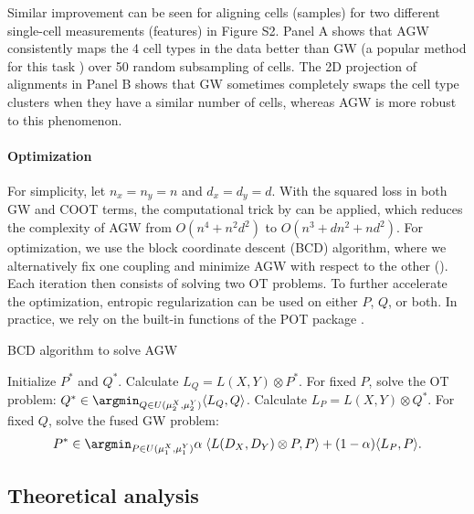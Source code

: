Similar improvement can be seen for aligning cells (samples) for two different single-cell
measurements (features) \citep{SNAREseq} in Figure S2. Panel A shows that AGW consistently maps
the 4 cell types in the data better than GW (a popular method for this task
\citep{Pamona,Demetci20,Demetci22,UniPort}) over 50 random subsampling of cells.
The 2D projection of alignments in Panel B shows that GW sometimes completely swaps
the cell type clusters when they have a similar number of cells, whereas AGW is more robust
to this phenomenon.

\paragraph{Optimization} For simplicity, let $n_x = n_y = n$ and $d_x = d_y = d$.
With the squared loss in both GW and COOT terms, the computational trick by \citep{Peyre16}
can be applied, which reduces the complexity of AGW from $O(n^4 + n^2 d^2)$
to $O(n^3 + dn^2 + nd^2)$. For optimization, we use the block coordinate descent (BCD) algorithm,
where we alternatively fix one coupling and minimize AGW with respect to the other ().
Each iteration then consists of solving two OT problems. To further accelerate the optimization,
entropic regularization can be used \citep{Cuturi13} on either $P$, $Q$, or both.
In practice, we rely on the built-in functions of the POT package \citep{Flamary21}.

\begin{algorithm}[t]
    \caption{BCD algorithm to solve AGW \label{alg:bcd_agw}}
    \begin{algorithmic}[1]
      \STATE Initialize $P^*$ and $Q^*$.
      \REPEAT
      \STATE Calculate $L_Q = L(X, Y) \otimes P^*$.
      \STATE For fixed $P$, solve the OT problem:
      $Q^* \in \argmin_{Q \in U(\mu_2^X, \mu_2^Y)} \langle L_Q, Q \rangle$.
      \STATE Calculate $L_P = L(X, Y) \otimes Q^*$.
      \STATE For fixed $Q$, solve the fused GW problem:
      \begin{align}
        P^* \in \argmin_{P \in U(\mu_1^X, \mu_1^Y)}
        \alpha \; \langle L(D_X,D_Y) \otimes P, P \rangle + (1-\alpha) \langle L_P, P \rangle.
      \end{align}
\end{algorithmic}
\end{algorithm}

\subsection{Theoretical analysis} \label{subsec:agw_property}

